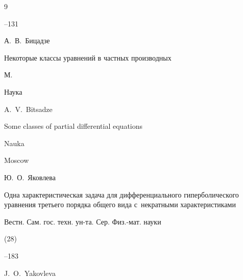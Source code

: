 \begin{thebibliography}{9}

--131 







\by А.~В.~Бицадзе

\book Некоторые классы уравнений в частных производных 

\publaddr М.

\publ Наука 



\misctransl

\by A.~V.~Bitsadze

\book Some classes of partial differential equations

\publ Nauka

\publaddr Moscow
















\by Ю.~О.~Яковлева

\paper Одна характеристическая задача для дифференциального гиперболического уравнения третьего порядка общего вида с~некратными характеристиками

\jour Вестн. Сам. гос. техн. ун-та. Сер. Физ.-мат. науки


(28)

--183


\misctransl

\by J.~O.~Yakovleva


\end{thebibliography}
